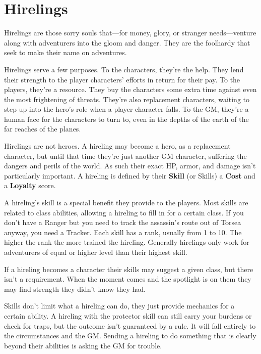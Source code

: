 \chapter{Hirelings}
  
       

Hirelings are those sorry souls that—for money, glory, or stranger needs—venture along with adventurers into the gloom and danger. They are the foolhardy that seek to make their name on adventures.

       

Hirelings serve a few purposes. To the characters, they're the help. They lend their strength to the player characters' efforts in return for their pay. To the players, they're a resource. They buy the characters some extra time against even the most frightening of threats. They're also replacement characters, waiting to step up into the hero's role when a player character falls. To the GM, they're a human face for the characters to turn to, even in the depths of the earth of the far reaches of the planes.

       

Hirelings are not heroes. A hireling may become a hero, as a replacement character, but until that time they're just another GM character, suffering the dangers and perils of the world. As such their exact HP, armor, and damage isn't particularly important. A hireling is defined by their {\bf Skill}  (or Skills) a {\bf Cost}  and a {\bf Loyalty}  score.

       

A hireling's skill is a special benefit they provide to the players. Most skills are related to class abilities, allowing a hireling to fill in for a certain class. If you don't have a Ranger but you need to track the assassin's route out of Torsea anyway, you need a Tracker. Each skill has a rank, usually from 1 to 10. The higher the rank the more trained the hireling. Generally hirelings only work for adventurers of equal or higher level than their highest skill.

       

If a hireling becomes a character their skills may suggest a given class, but there isn't a requirement. When the moment comes and the spotlight is on them they may find strength they didn't know they had.

       

Skills don't limit what a hireling can do, they just provide mechanics for a certain ability. A hireling with the protector skill can still carry your burdens or check for traps, but the outcome isn't guaranteed by a rule. It will fall entirely to the circumstances and the GM. Sending a hireling to do something that is clearly beyond their abilities is asking the GM for trouble.

